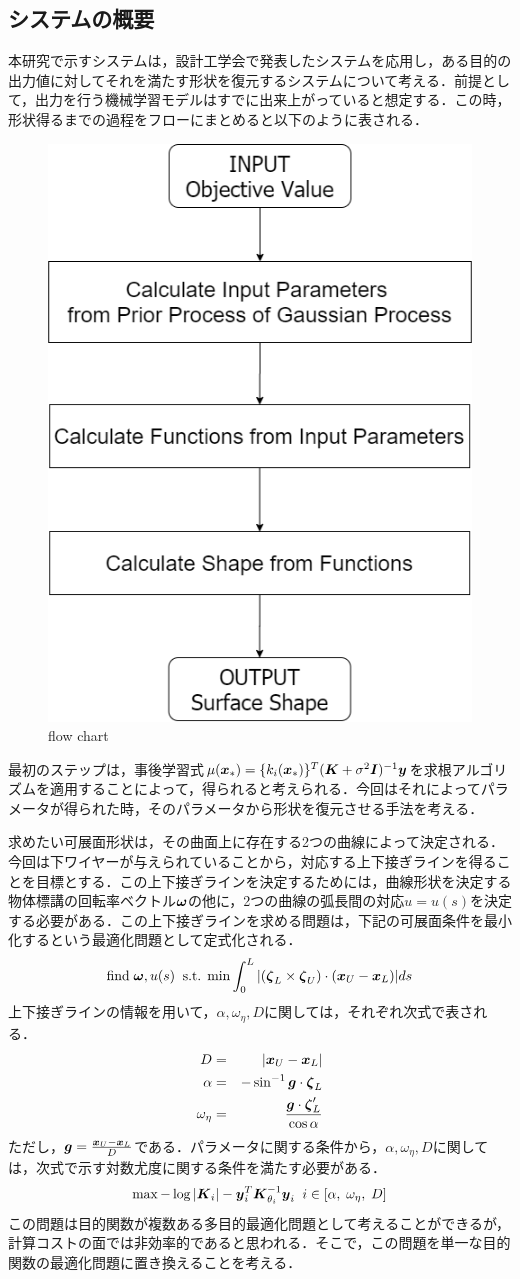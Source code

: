 \documentclass[11pt]{jsarticle}
\begin{document}
		\subsection{システムの概要}
			本研究で示すシステムは，設計工学会で発表したシステムを応用し，ある目的の出力値に対してそれを満たす形状を復元するシステムについて考える．前提として，出力を行う機械学習モデルはすでに出来上がっていると想定する．この時，形状得るまでの過程をフローにまとめると以下のように表される．
			\begin{figure}[!h]
				\centering
				\includegraphics[width = 0.3\columnwidth]{./figure/flowoutput.png}
				\caption{flow chart}
			\end{figure}
			最初のステップは，事後学習式$ \mu(\boldsymbol{x}_*) = \{ k_i (\boldsymbol{x}_*)\}^T (\boldsymbol{K} + \sigma^2 \boldsymbol{I})^{-1} \boldsymbol{y} $を求根アルゴリズムを適用することによって，得られると考えられる．今回はそれによってパラメータが得られた時，そのパラメータから形状を復元させる手法を考える．
			
			求めたい可展面形状は，その曲面上に存在する2つの曲線によって決定される．今回は下ワイヤーが与えられていることから，対応する上下接ぎラインを得ることを目標とする．この上下接ぎラインを決定するためには，曲線形状を決定する物体標講の回転率ベクトル$ \boldsymbol{\omega} $の他に，2つの曲線の弧長間の対応$ u=u(s) $を決定する必要がある．この上下接ぎラインを求める問題は，下記の可展面条件を最小化するという最適化問題として定式化される．
			\begin{equation}\label{eq:DevCond_eq}
					\mathrm{find}\; \boldsymbol{\omega},u(s) \;\; \mathrm{s.t.} \; \min \int_{0}^{L} |(\boldsymbol{\zeta}_L \times \boldsymbol{\zeta}_U) \cdot (\boldsymbol{x}_U - \boldsymbol{x}_L)| ds					
			\end{equation}
			上下接ぎラインの情報を用いて，$ \alpha,\omega_{\eta},D $に関しては，それぞれ次式で表される．
			\begin{eqnarray}
			D &=& |\boldsymbol{x}_U - \boldsymbol{x}_L|\\
			\alpha &=& -\sin^{-1} \boldsymbol{g} \cdot \boldsymbol{\zeta}_L\\
			\omega_{\eta} &=& \frac{\boldsymbol{g} \cdot \boldsymbol{\zeta}_L'}{\cos \alpha}
			\end{eqnarray}
			ただし，$ \boldsymbol{g}  = \frac{\boldsymbol{x}_U - \boldsymbol{x}_L}{D}$である．パラメータに関する条件から，$ \alpha,\omega_{\eta},D  $に関しては，次式で示す対数尤度に関する条件を満たす必要がある．
			\begin{equation}\label{eq:st.likelihood}
				\max -\log|\boldsymbol{K}_i| - \boldsymbol{y}_i^T \boldsymbol{K}_{\theta_i}^{-1} \boldsymbol{y}_i \;\; i\in [\alpha,\;\omega_{\eta},\;D]
			\end{equation}
			この問題は目的関数が複数ある多目的最適化問題として考えることができるが，計算コストの面では非効率的であると思われる．そこで，この問題を単一な目的関数の最適化問題に置き換えることを考える．
			
\end{document}
